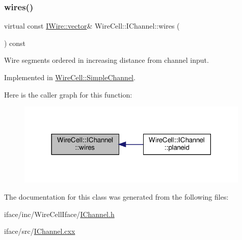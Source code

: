 \subsubsection{\texorpdfstring{wires()}{wires()}}
{\footnotesize\ttfamily virtual const \hyperlink{class_wire_cell_1_1_i_data_ae1a9f863380499bb43f39fabb6276660}{I\+Wire\+::vector}\& Wire\+Cell\+::\+I\+Channel\+::wires (\begin{DoxyParamCaption}{ }\end{DoxyParamCaption}) const\hspace{0.3cm}{\ttfamily [pure virtual]}}



Wire segments ordered in increasing distance from channel input. 



Implemented in \hyperlink{class_wire_cell_1_1_simple_channel_a4e3b8a6e1f4d2ac98b532bb79aaaa6ef}{Wire\+Cell\+::\+Simple\+Channel}.

Here is the caller graph for this function\+:
\nopagebreak
\begin{figure}[H]
\begin{center}
\leavevmode
\includegraphics[width=314pt]{class_wire_cell_1_1_i_channel_a699d41be0c4e79f99dfef3b69394cf52_icgraph}
\end{center}
\end{figure}


The documentation for this class was generated from the following files\+:\begin{DoxyCompactItemize}
\item 
iface/inc/\+Wire\+Cell\+Iface/\hyperlink{_i_channel_8h}{I\+Channel.\+h}\item 
iface/src/\hyperlink{_i_channel_8cxx}{I\+Channel.\+cxx}\end{DoxyCompactItemize}

